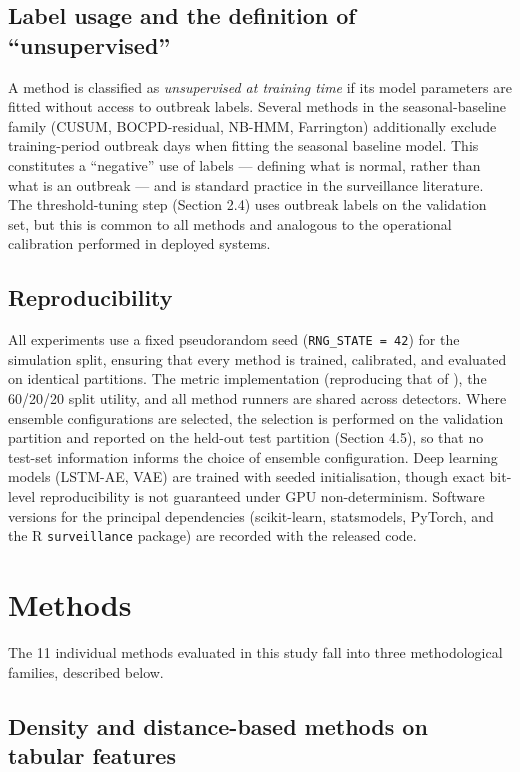 \documentclass[11pt]{article}
\begin{document}
\subsection{Label usage and the definition of ``unsupervised''}

A method is classified as \textit{unsupervised at training time} if its model parameters are fitted without access to outbreak labels. Several methods in the seasonal-baseline family (CUSUM, BOCPD-residual, NB-HMM, Farrington) additionally exclude training-period outbreak days when fitting the seasonal baseline model. This constitutes a ``negative'' use of labels --- defining what is normal, rather than what is an outbreak --- and is standard practice in the surveillance literature. The threshold-tuning step (Section 2.4) uses outbreak labels on the validation set, but this is common to all methods and analogous to the operational calibration performed in deployed systems.

\subsection{Reproducibility}

All experiments use a fixed pseudorandom seed (\texttt{RNG\_STATE = 42}) for the simulation split, ensuring that every method is trained, calibrated, and evaluated on identical partitions. The metric implementation (reproducing that of \citealp{noufaily2019}), the 60/20/20 split utility, and all method runners are shared across detectors. Where ensemble configurations are selected, the selection is performed on the validation partition and reported on the held-out test partition (Section 4.5), so that no test-set information informs the choice of ensemble configuration. Deep learning models (LSTM-AE, VAE) are trained with seeded initialisation, though exact bit-level reproducibility is not guaranteed under GPU non-determinism. Software versions for the principal dependencies (scikit-learn, statsmodels, PyTorch, and the R \texttt{surveillance} package) are recorded with the released code.


\section{Methods}

The 11 individual methods evaluated in this study fall into three methodological families, described below.

\subsection{Density and distance-based methods on tabular features}
\end{document}
